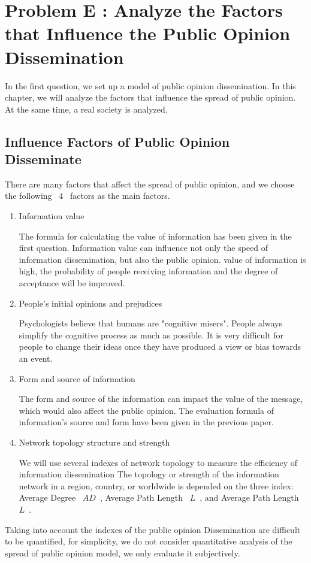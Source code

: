 \documentclass[a4paper,11pt]{article}
\begin{document}
\section{Problem E : Analyze the Factors that Influence the Public Opinion Dissemination}
\par In the first question, we set up a model of public opinion dissemination. In this chapter, we will analyze the factors that influence the spread of public opinion. At the same time, a real society is analyzed.
\subsection{Influence Factors of Public Opinion Disseminate}
\par There are many factors that affect the spread of public opinion, and we choose the following ~$4$~ factors as the main factors.


\begin{enumerate}%
\renewcommand{\labelenumi}{(\theenumi)}
    \item Information value

    The formula for calculating the value of information has been given in the first question. Information value can influence not only the speed of information dissemination, but also the public opinion. value of information is high, the probability of people receiving information and the degree of acceptance will be improved.


    \item People's initial opinions and prejudices

    Psychologists believe that humans are "cognitive misers"\cite{RE}. People always simplify the cognitive process as much as possible. It is very difficult for people to change their ideas once they have produced a view or bias towards an event.
    \item Form and source of information

    The form and source of the information can impact the value of the message, which would also affect the public opinion. The evaluation formula of information's source and form have been given in the previous paper.


    \item Network topology structure and strength

    We will use several indexes of network topology to measure the efficiency of information dissemination
    The topology or strength of the information network in a region, country, or worldwide is depended on the three index: Average Degree ~$AD$~, Average Path Length ~$L$~, and Average Path Length ~$L$~.
\end{enumerate}
\par Taking into account the indexes of the public opinion Dissemination are difficult to be quantified, for simplicity, we do not consider quantitative analysis of the spread of public opinion model, we only evaluate it subjectively.
\end{document}
